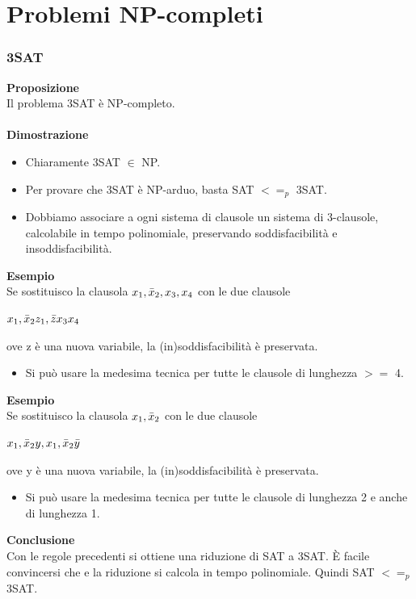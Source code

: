 \chapter{Problemi NP-completi} \label{ch:capitolo13}
\subsection{3SAT}
\textbf{Proposizione}\\
Il problema 3SAT è NP-completo.\\\\
\textbf{Dimostrazione}      
\begin{itemize}
    \item Chiaramente 3SAT $\in$ NP.
    
    \item Per provare che 3SAT è NP-arduo, basta SAT $<=_p$ 3SAT.
    
    \item Dobbiamo associare a ogni sistema di clausole un sistema di 3-clausole, calcolabile in tempo polinomiale, preservando soddisfacibilità e insoddisfacibilità.
\end{itemize}
\textbf{Esempio}\\
Se sostituisco la clausola $x_1, \Bar{x}_2, x_3, x_4$ con le due clausole
\begin{center}
    $x_1, \Bar{x}_2z_1, \Bar{z}x_3x_4$
\end{center}
ove z è una nuova variabile, la (in)soddisfacibilità è preservata.
\begin{itemize}
    \item Si può usare la medesima tecnica per tutte le clausole di lunghezza $>=$ 4.
\end{itemize}
\textbf{Esempio}\\
Se sostituisco la clausola $x_1, \Bar{x}_2$ con le due clausole
\begin{center}
    $x_1, \Bar{x}_2y, x_1, \Bar{x}_2\Bar{y}$
\end{center}
ove y è una nuova variabile, la (in)soddisfacibilità è preservata.
\begin{itemize}
    \item Si può usare la medesima tecnica per tutte le clausole di lunghezza 2 e anche di lunghezza 1.
\end{itemize}
\textbf{Conclusione}\\
Con le regole precedenti si ottiene una riduzione di SAT a 3SAT. È facile convincersi che e la riduzione si calcola in tempo polinomiale.
Quindi SAT $<=_p$ 3SAT.
